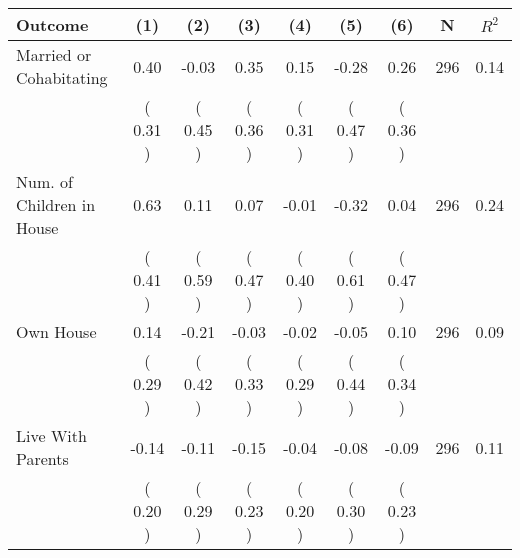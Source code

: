 \begin{tabular}{lcccccccc}
\toprule
 \textbf{Outcome} & \textbf{(1)} & \textbf{(2)} & \textbf{(3)} & \textbf{(4)} & \textbf{(5)} & \textbf{(6)} & \textbf{N} & \textbf{$ R^2$} \\
\midrule
Married or Cohabitating &      0.40 &     -0.03 &      0.35 &      0.15 &     -0.28 &      0.26 & 296 &       0.14 \\ 
 & (     0.31 ) & (     0.45 ) & (     0.36 ) & (     0.31 ) & (     0.47 ) & (     0.36 ) & \\
Num. of Children in House &      0.63 &      0.11 &      0.07 &     -0.01 &     -0.32 &      0.04 & 296 &       0.24 \\ 
 & (     0.41 ) & (     0.59 ) & (     0.47 ) & (     0.40 ) & (     0.61 ) & (     0.47 ) & \\
Own House &      0.14 &     -0.21 &     -0.03 &     -0.02 &     -0.05 &      0.10 & 296 &       0.09 \\ 
 & (     0.29 ) & (     0.42 ) & (     0.33 ) & (     0.29 ) & (     0.44 ) & (     0.34 ) & \\
Live With Parents &     -0.14 &     -0.11 &     -0.15 &     -0.04 &     -0.08 &     -0.09 & 296 &       0.11 \\ 
 & (     0.20 ) & (     0.29 ) & (     0.23 ) & (     0.20 ) & (     0.30 ) & (     0.23 ) & \\
\bottomrule
\end{tabular}
